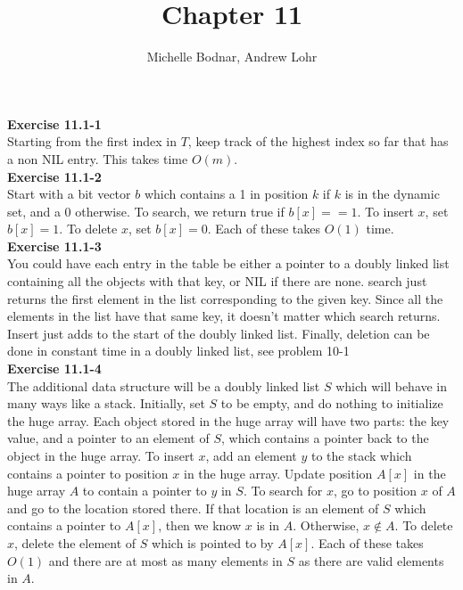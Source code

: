 \documentclass{article}
\title{Chapter 11}
\author{Michelle Bodnar, Andrew Lohr}
\begin{document}
\maketitle

\noindent\textbf{ Exercise 11.1-1} \\

Starting from the first index in $T$, keep track of the highest index so far that has a non NIL entry. This takes time $O(m)$.\\

\noindent\textbf{Exercise 11.1-2}\\

Start with a bit vector $b$ which contains a 1 in position $k$ if $k $ is in the dynamic set, and a 0 otherwise.  To search, we return true if $b[x] == 1$. To insert $x$, set $b[x] = 1$. To delete $x$, set $b[x] = 0$. Each of these takes $O(1)$ time. \\


\noindent\textbf{ Exercise 11.1-3} \\

You could have each entry in the table be either a pointer to a doubly linked list containing all the objects with that key, or NIL if there are none. search just returns the first element in the list corresponding to the given key. Since all the elements in the list have that same key, it doesn't matter which search returns. Insert just adds to the start of the doubly linked list. Finally, deletion can be done in constant time in a doubly linked list, see problem 10-1\\

\noindent\textbf{Exercise 11.1-4}\\

The additional data structure will be a doubly linked list $S$ which will behave in many ways like a stack.  Initially, set $S$ to be empty, and do nothing to initialize the huge array.  Each object stored in the huge array will have two parts: the key value, and a pointer to an element of $S$, which contains a pointer back to the object in the huge array.  To insert $x$, add an element $y$ to the stack which contains a pointer to position $x$ in the huge array.  Update position $A[x]$ in the huge array $A$ to contain a pointer to $y$ in $S$.  To search for $x$, go to position $x$ of $A$ and go to the location stored there. If that location is an element of $S$ which contains a pointer to $A[x]$, then we know $x$ is in $A$. Otherwise, $x \notin A$. To delete $x$, delete the element of $S$ which is pointed to by $A[x]$. Each of these takes $O(1)$ and there are at most as many elements in $S$ as there are valid elements in $A$.\\
\end{document}
